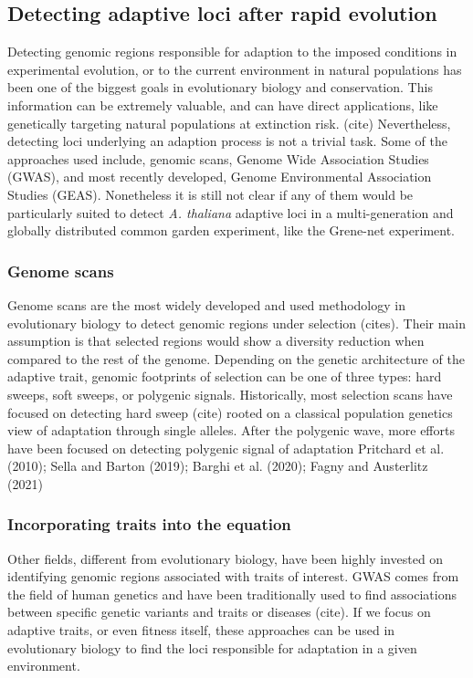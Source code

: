 \documentclass{article}
\begin{document}
\subsection{Detecting adaptive loci after rapid evolution}
Detecting genomic regions responsible for adaption to the imposed conditions in experimental evolution, or to the current environment in natural populations has been one of the biggest goals in evolutionary biology and conservation. This information can be extremely valuable, and can have direct applications, like genetically targeting natural populations at extinction risk. (cite) Nevertheless, detecting loci underlying an adaption process is not a trivial task. Some of the approaches used include, genomic scans, Genome Wide Association Studies (GWAS), and most recently developed, Genome Environmental Association Studies (GEAS). Nonetheless it is still not clear if any of them would be particularly suited to detect \textit{A. thaliana} adaptive loci in a multi-generation and globally distributed common garden experiment, like the Grene-net experiment.

\subsubsection{Genome scans}
Genome scans are the most widely developed and used methodology in evolutionary biology to detect genomic regions under selection (cites). Their main assumption is that selected regions would show a diversity reduction when compared to the rest of the genome. Depending on the genetic architecture of the adaptive trait,  genomic footprints of selection can be one of three types: hard sweeps, soft sweeps, or polygenic signals. Historically, most selection scans have focused on detecting hard sweep (cite) rooted on a classical population genetics view of adaptation through single alleles. After the polygenic wave, more efforts have been focused on detecting polygenic signal of adaptation \citep{Berg2014-zl} Pritchard et al. (2010); Sella and Barton (2019); Barghi et al. (2020); Fagny and Austerlitz (2021) \citep{Stephan2016-tx}

\subsubsection{Incorporating traits into the equation} 
Other fields, different from evolutionary biology, have been highly invested on identifying genomic regions associated with traits of interest. GWAS comes from the field of human genetics and have been traditionally used to find associations between specific genetic variants and traits or diseases (cite). If we focus on adaptive traits, or even fitness itself, these approaches can be used in evolutionary biology to find the loci responsible for adaptation in a given environment. 
\end{document}
